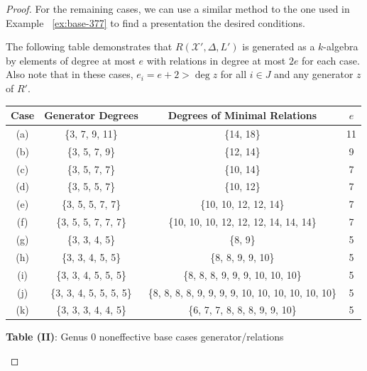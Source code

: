 \documentclass{amsart}
\theoremstyle{plain}
\theoremstyle{definition}
\theoremstyle{remark}
\numberwithin{equation}{section}
\newcommand \sx{\mathscr X}
\begin{document}
\begin{proof}
For the remaining cases, we can use a similar method to the one
used in Example ~\ref{ex:base-377} to find a presentation the
desired conditions.

The following table demonstrates that $R(\sx', \Delta, L')$ is
generated as a $k$-algebra by elements of degree at most $e$
with relations in degree at most $2e$ for each case. Also note
that in these cases, $e_i = e + 2 > \deg z$ for all $i \in J$
and any generator $z$ of $R'$.
\begin{longtable}
	{| c || c | c | c |}
	\hline
	Case & Generator Degrees & Degrees of Minimal Relations & $e$\\
	\hline
	\hline

	(a) & \{3, 7, 9, 11\} & \{14, 18\} & 11\\	\hline

	(b) & \{3, 5, 7, 9\} & \{12, 14\}	& 9\\ \hline

	(c) & \{3, 5, 7, 7\} & \{10, 14\}	& 7\\ \hline
	
	(d) & \{3, 5, 5, 7\} & \{10, 12\}	& 7\\ \hline
	
	(e) & \{3, 5, 5, 7, 7\} & \{10, 10, 12, 12, 14\}	& 7\\ \hline
	
	(f) & \{3, 5, 5, 7, 7, 7\} & \{10, 10, 10, 12, 12, 12, 14, 14, 14\}	& 7\\ \hline

	(g) & \{3, 3, 4, 5\} & \{8, 9\} & 5\\ \hline
	
	(h) & \{3, 3, 4, 5, 5\} & \{8, 8, 9, 9, 10\} & 5\\ \hline
	
	(i) & \{3, 3, 4, 5, 5, 5\} &
	\{8, 8, 8, 9, 9, 9, 10, 10, 10\} & 5\\ \hline
	
	(j) & \{3, 3, 4, 5, 5, 5, 5\} &
	\{8, 8, 8, 8, 9, 9, 9, 9, 10, 10, 10, 10, 10, 10\} & 5\\ \hline

	(k) &	\{3, 3, 3, 4,	4, 5\} & \{6, 7, 7, 8, 8, 8, 9, 9, 10\} & 5\\ \hline
\end{longtable}

\begin{center}
\textbf{Table (II)}: Genus 0 noneffective base cases generator/relations
\end{center}


\end{proof}
\end{document}
